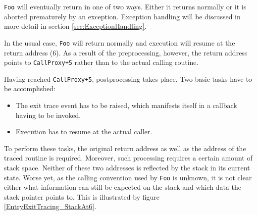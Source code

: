 \verb|Foo| will eventually return in one of two ways. Either it returns normally
or it is aborted prematurely by an exception. Exception handling will be discussed 
in more detail in section \ref{sec:ExceptionHandling}.

In the usual case, \verb|Foo| will return normally and execution will resume at the
return address (6). As a result of the preprocessing, however, the return address points
to \verb|CallProxy+5| rather than to the actual calling routine. 

Having reached \verb|CallProxy+5|, postprocessing takes place. Two basic tasks have
to be accomplished:

\begin{itemize}
	\item The exit trace event has to be raised, which manifests itself in
		a callback having to be invoked.
	\item Execution has to resume at the actual caller.
\end{itemize}

To perform these tasks, the original return address as well as the address of
the traced routine is required. Moreover, such processing requires a certain amount
of stack space. 
Neither of these two addresses is reflected by the stack in its current state. 
Worse yet, as the calling convention used by \verb|Foo| is unknown, it is not clear 
either what information can still be expected on the stack and which data the stack 
pointer points to. This is illustrated by figure \ref{EntryExitTracing_StackAt6}.

